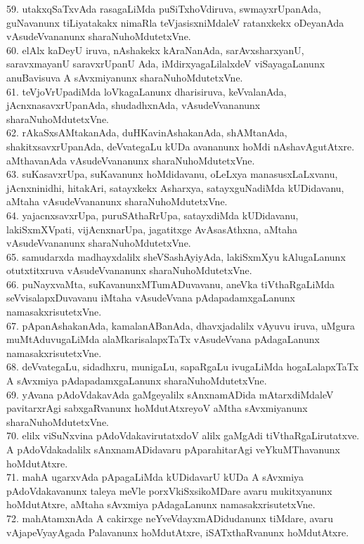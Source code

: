 \documentclass{article}
\begin{document}
59. utakxqSaTxvAda rasagaLiMda puSiTxhoVdiruva, swmayxrUpanAda, guNavanunx tiLiyatakakx nimaRla teVjasisxniMdaleV ratanxkekx oDeyanAda vAsudeVvananunx sharaNuhoMdutetxVne.\\
60. elAlx kaDeyU iruva, nAshakekx kAraNanAda, sarAvxsharxyanU, saravxmayanU saravxrUpanU Ada, iMdirxyagaLilalxdeV viSayagaLanunx anuBavisuva A sAvxmiyanunx sharaNuhoMdutetxVne.\\
61. teVjoVrUpadiMda loVkagaLanunx dharisiruva, keVvalanAda, jAcnxnasavxrUpanAda, shudadhxnAda, vAsudeVvananunx sharaNuhoMdutetxVne.\\
62. rAkaSxsAMtakanAda, duHKavinAshakanAda, shAMtanAda, shakitxsavxrUpanAda, deVvategaLu kUDa avananunx hoMdi nAshavAgutAtxre. aMthavanAda vAsudeVvananunx sharaNuhoMdutetxVne.\\
63. suKasavxrUpa, suKavanunx hoMdidavanu, oLeLxya manasusxLaLxvanu, jAcnxninidhi, hitakAri, satayxkekx Asharxya, satayxguNadiMda kUDidavanu, aMtaha vAsudeVvananunx sharaNuhoMdutetxVne.\\
64. yajacnxsavxrUpa, puruSAthaRrUpa, satayxdiMda kUDidavanu, lakiSxmXVpati, vijAcnxnarUpa, jagatitxge AvAsasAthxna, aMtaha vAsudeVvananunx sharaNuhoMdutetxVne.\\
65. samudarxda madhayxdalilx sheVSashAyiyAda, lakiSxmXyu kAlugaLanunx otutxtitxruva vAsudeVvananunx sharaNuhoMdutetxVne.\\
66. puNayxvaMta, suKavanunxMTumADuvavanu, aneVka tiVthaRgaLiMda seVvisalapxDuvavanu iMtaha vAsudeVvana pAdapadamxgaLanunx namasakxrisutetxVne.\\
67. pApanAshakanAda, kamalanABanAda, dhavxjadalilx vAyuvu iruva, uMgura muMtAduvugaLiMda alaMkarisalapxTaTx vAsudeVvana pAdagaLanunx namasakxrisutetxVne.\\
68. deVvategaLu, sidadhxru, munigaLu, sapaRgaLu ivugaLiMda hogaLalapxTaTx A sAvxmiya pAdapadamxgaLanunx sharaNuhoMdutetxVne.\\
69. yAvana pAdoVdakavAda gaMgeyalilx sAnxnamADida mAtarxdiMdaleV pavitarxrAgi sabxgaRvanunx hoMdutAtxreyoV aMtha sAvxmiyanunx sharaNuhoMdutetxVne.\\
70. elilx viSuNxvina pAdoVdakavirutatxdoV alilx gaMgAdi tiVthaRgaLirutatxve. A pAdoVdakadalilx sAnxnamADidavaru pAparahitarAgi veYkuMThavanunx hoMdutAtxre.\\
71. mahA ugarxvAda pApagaLiMda kUDidavarU kUDa A sAvxmiya pAdoVdakavanunx taleya meVle porxVkiSxsikoMDare avaru mukitxyanunx hoMdutAtxre, aMtaha sAvxmiya pAdagaLanunx namasakxrisutetxVne.\\
72. mahAtamxnAda A cakirxge neYveVdayxmADidudanunx tiMdare, avaru vAjapeVyayAgada Palavanunx hoMdutAtxre, iSATxthaRvanunx hoMdutAtxre.\\
\end{document}

